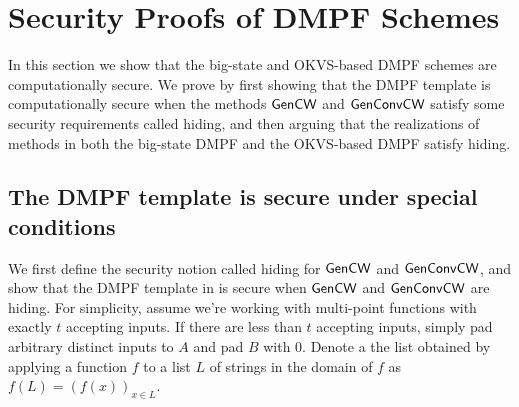 \section{Security Proofs of DMPF Schemes}\label{sec:security_proof}
In this section we show that the big-state and OKVS-based DMPF schemes are computationally secure. We prove by first showing that the DMPF template is computationally secure when the methods $\sf  GenCW$ and $\sf GenConvCW$ satisfy some security requirements called hiding, and then arguing that the realizations of methods in both the big-state DMPF and the OKVS-based DMPF satisfy hiding. 

\subsection{The DMPF template is secure under special conditions}\label{sec:template_security_proof}
We first define the security notion called hiding for ${\sf Gen}{\sf CW}$ and ${\sf Gen}{\sf Conv}{\sf CW}$, and show that the DMPF template in  is secure when ${\sf Gen}{\sf CW}$ and ${\sf Gen}{\sf Conv}{\sf CW}$ are hiding. For simplicity, assume we're working with multi-point functions with exactly $t$ accepting inputs. If there are less than $t$ accepting inputs, simply pad arbitrary distinct inputs to $A$ and pad $B$ with $0$. Denote a the list obtained by applying a function $f$ to a list $L$ of strings in the domain of $f$ as $f(L) = (f(x))_{x\in L}$. 

